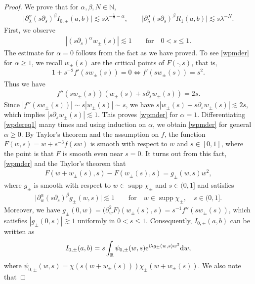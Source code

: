 \documentclass[10pt,a4paper]{amsart}
\numberwithin{equation}{section}
\def\R{\mathbb{R}}%
\DeclareMathOperator{\supp}{supp}%
\def\a{\alpha}
\def\b{\beta}
\def\g{\psi}
\def\l{\lambda}
\def\pa{\partial}
\begin{document}
\begin{proof}
We prove that for $\a,\b,N\in\mathbb{N}$,
\begin{align}\label{I0abest}
\big|\pa_{\l}^{\a}(s\pa_{s})^{\b}I_{0,\pm}(a,b)\big|\lesssim s\l^{-\frac{1}{2}-\a},\qquad \big|\pa_{\l}^{\a}(s\pa_{s})^{\b}R_1(a,b)\big|\lesssim s\l^{-N}.
\end{align}
First, we observe
\begin{align}\label{wpmder}
|(s\pa_s)^{\a}w_{\pm}(s)|\lesssim 1\qquad \text{for}\quad 0<s\leq 1.
\end{align}
The estimate for $\a=0$ follows from the fact  as we have proved.
To see \eqref{wpmder} for $\a\geq 1$, we recall $w_{\pm}(s)$ are the critical points of $F(\cdot,s)$, that is,
\begin{align*}
1+s^{-2}f'(sw_{\pm}(s))=0\Leftrightarrow f'(sw_{\pm}(s))=s^2.
\end{align*}
Thus we have
\begin{align}\label{wpdereq1}
f''(sw_{\pm}(s))(w_{\pm}(s)+s\pa_sw_{\pm}(s))=2s.
\end{align}
Since $|f''(sw_{\pm}(s))|\sim s|w_{\pm}(s)|\sim s$, we have $s|w_{\pm}(s)+s\pa_sw_{\pm}(s)|\lesssim 2s$, which implies $|s\pa_sw_{\pm}(s)|\allowbreak\lesssim 1$. This proves \eqref{wpmder} for $\a=1$. Differentiating \eqref{wpdereq1} many times and using induction on $\a$, we obtain \eqref{wpmder} for general $\a\geq 0$. By Taylor's theorem and the assumption on $f$, the function~${F(w,s)=w+s^{-3}f(sw)}$ is smooth with respect to $w$ and $s\in [0,1]$, where the point is that $F$ is smooth even near $s=0$. It turns out from this fact, \eqref{wpmder} and the Taylor's theorem that
\begin{align*}
F(w+w_{\pm}(s),s)-F(w_{\pm}(s),s)=g_{\pm}(w,s)w^2,
\end{align*}
where $g_{\pm}$ is smooth with respect to $w\in \supp \chi_{\pm}$ and $s\in (0,1]$ and satisfies
\begin{align*}
\big|\pa_w^{\a}(s\pa_s)^{\b}g_{\pm}(w,s)\big|\lesssim 1\qquad \text{for}\quad w\in \supp \chi_{\pm},\quad s\in (0,1].
\end{align*}
Moreover, we have $g_{\pm}(0,w)=\bigl(\pa_w^2F\bigr)(w_{\pm}(s),s)=s^{-1}f''(sw_{\pm}(s))$, which satisfies $|g_{\pm}(0,s)|\gtrsim 1$ uniformly in $0<s\leq 1$. Consequently, $I_{0,\pm}(a,b)$ can be written as
\begin{align*}
I_{0,\pm}(a,b)=s\int_{\R}\g_{0,\pm}(w,s){\rm e}^{{\rm i}\l g_{\pm}(w,s)w^2}{\rm d}w,
\end{align*}
where $\g_{0,\pm}(w,s)=\chi(s(w+w_{\pm}(s)))\chi_{\pm}(w+w_{\pm}(s))$. We also note that

\end{proof}
\end{document}
